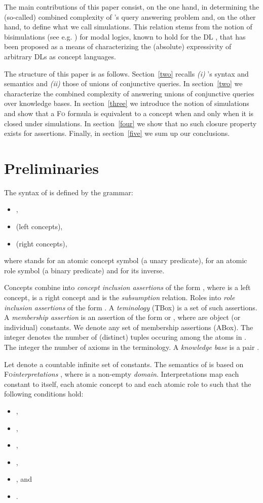 \documentclass[11pt]{llncs}
\newcommand{\logic}[1]{\textsc{#1}\xspace}
\newcommand{\FOL}{\logic{Fo}}
\begin{document}
The main contributions of this paper consist, on the one hand,
in determining the (so-called) combined complexity of 's
query answering problem and, on the other hand,
to define what
we call  simulations.
This relation stems from the notion of bisimulations
(see e.g. \cite{vanBenthem2006}) for modal logics, known
to hold for the DL  \cite{DLHandbook}, that
has been proposed \cite{deRijke1997} as a means
of characterizing the (absolute)
expressivity of arbitrary DLs as concept languages.

The structure of this paper is as follows.
Section~\ref{two} recalls \textit{(i)} 's syntax
and semantics and \textit{(ii)} those of unions of conjunctive queries.
In section~\ref{two} we characterize the 
combined complexity of answering unions of conjunctive queries
over  knowledge bases.
In section~\ref{three} we introduce the notion
of  simulations
and show that a \FOL formula is equivalent to a 
concept when and only when it is closed under  simulations.
In section~\ref{four} we show that no such closure property
exists for assertions.
Finally, in section~\ref{five} we sum up our conclusions.

\section{Preliminaries}\label{one}


The syntax of
 is defined by the grammar:
\begin{itemize}
\item ,
\item  (left concepts),
\item  (right concepts),
\end{itemize}
where  stands for an atomic concept symbol (a unary predicate),
 for an atomic role symbol (a binary predicate) and  for its inverse.

Concepts combine into {\em concept inclusion assertions} of the form
, where  is a left concept,  is a right concept
and  is the {\em subsumption} relation. Roles into
{\em role inclusion assertions} of the form .
A {\em teminology}  (TBox) is a set of such assertions.
A {\em membership assertion} is an assertion of the form 
 or , where  are object (or individual) constants.
We denote  any set of membership assertions (ABox).
The integer
 denotes the number of (distinct)
tuples occuring among the atoms in .
The integer  the number of axioms in the terminology.
A {\em knowledge base} is a pair .

Let  denote a countable infinite set of constants.
The semantics of 
is based on \FOL\xspace {\em interpretations} , where
 is a non-empty {\em domain}.
Interpretations map each constant  to itself,
each atomic concept  to 
and each atomic role  to 
such that the following conditions hold:
\begin{itemize}
\item ,
\item , 
\item ,
\item ,
\item , and
\item .
\end{itemize}
\end{document}
